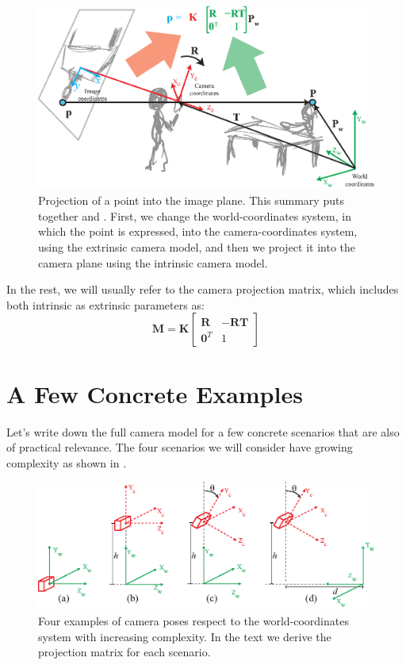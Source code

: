 \begin{figure}[t]
\centerline{
\includegraphics[width=0.8\linewidth]{figures/imaging_geometry/summary_camera_model.eps}
}
\caption{Projection of a point into the image plane. This summary puts together \fig{\ref{fig:pinholeGeometry2bis}} and \fig{\ref{fig:camera_calibration}}. First, we change the world-coordinates system, in which the point is expressed, into the camera-coordinates system, using the extrinsic camera model, and then we project it into the camera plane using the intrinsic camera model.}
\label{fig:summary_camera_projection}
\end{figure}


In the rest, we will usually refer to the camera projection matrix, which includes both intrinsic as extrinsic parameters as:
\begin{equation}
    \mathbf{M} = 
    \mathbf{K}
    \begin{bmatrix}
    \mathbf{R} & -\mathbf{R}\mathbf{T} \\
    \mathbf{0}^T & 1
    \end{bmatrix}
\label{eq:projection_matrix}
\end{equation}

\section{A Few Concrete Examples}

Let's write down the full camera model for a few concrete scenarios that are also of practical relevance. The four scenarios we will consider have growing complexity as shown in \fig{\ref{fig:camera_calibration_scenarios}}.


\begin{figure}
\centerline{
\includegraphics[width=1\linewidth]{figures/imaging_geometry/camera_calibration_scenarios.eps}
}
\caption{Four examples of camera poses respect to the world-coordinates system with increasing complexity. In the text we derive the projection matrix for each scenario.}
\label{fig:camera_calibration_scenarios}
\end{figure}

